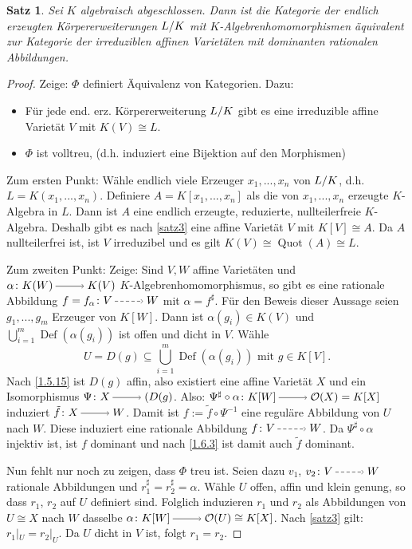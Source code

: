 \documentclass[a4paper,12pt]{scrbook}
\theoremstyle{keinenummern} %
\theoremstyle{mitnummern}
\newtheorem{satz}{Satz}
\theoremstyle{unserbeweis}
\newtheorem{proof}{Beweis}
\def\O{\mathcal{O}}
\newcommand{\Def}{\operatorname{Def}}
\newcommand{\Quot}{\operatorname{Quot}}
\newcommand{\restrict}[1]{|_{#1}}
\renewcommand{\dotsc}{\ensuremath{\!...}}
\newcommand{\ra}{\raisebox{-1pt}{\tikz{\draw[thin,shorten >=3pt, ->] (0,0) node{\hspace*{-2pt}} -- node{} (1,0);}}\penalty1000\relax}
\newcommand{\ppf}{\raisebox{-1pt}{\tikz{\draw[densely dashed,thin,shorten >=3pt, ->] (0,0) node{\hspace*{-2pt}} -- node{} (1,0);}}\penalty1000\relax}
\newcommand{\Quotient}[2]{
  \mathchoice
  { %
    \raisebox{0.7ex}{\ensuremath{#1}}
    \ensuremath{\mkern-3mu}\big/\ensuremath{\mkern-3mu}
    \raisebox{-0.6ex}{\ensuremath{#2}}
  }
  { %
    #1/#2
  }
  { %
    #1/#2
  }
  { %
    #1/#2
  }
}
\begin{document}
\begin{satz}\label{satz4} Sei $K$ algebraisch abgeschlossen. Dann ist die Kategorie der endlich erzeugten Körpererweiterungen $\Quotient{L}{K}$ mit $K$-Algebrenhomomorphismen äquivalent zur Kategorie der irreduziblen affinen Varietäten mit dominanten rationalen Abbildungen.
\end{satz}

\begin{proof} Zeige: $\Phi$ definiert Äquivalenz von Kategorien. Dazu:
  \begin{itemize}
  \item Für jede end. erz. Körpererweiterung $\Quotient{L}{K}$ gibt es eine irreduzible affine Varietät $V$ mit $K(V)\cong L$.
  \item $\Phi$ ist volltreu, (d.h. induziert eine Bijektion auf den Morphismen)
  \end{itemize}
Zum ersten Punkt: Wähle endlich viele Erzeuger $x_1,\dotsc,x_n$ von $\Quotient{L}{K}$, d.h. $L=K(x_1,\dotsc,x_n)$. Definiere $A=K[x_1,\dotsc,x_n]$ als die von $x_1,\dotsc,x_n$ erzeugte $K$-Algebra in $L$. Dann ist $A$ eine endlich erzeugte, reduzierte, nullteilerfreie
$K$-Algebra. Deshalb gibt es nach \cref{satz3} eine affine Varietät $V$ mit $K[V]\cong A$. Da $A$ nullteilerfrei ist, ist $V$ irreduzibel und es gilt $K(V)\cong \Quot(A)\cong L$.

Zum zweiten Punkt: Zeige: Sind $V,W$ affine Varietäten und $\alpha \colon K(W)\ra K(V)$ $K$-Algebrenhomomorphismus, so gibt es eine rationale Abbildung $f=f_{\alpha}\colon V\ppf W$ mit $\alpha=f^{\sharp}$.
Für den Beweis dieser Aussage seien $g_1,\dotsc,g_m$ Erzeuger von $K[W]$. Dann ist $\alpha(g_i)\in K(V)$ und $\bigcup_{i=1}^{m} \Def(\alpha(g_i))$ ist offen und dicht in $V$. Wähle \[U=D(g)\subseteq \bigcup_{i=1}^{m} \Def(\alpha(g_i))\text{ mit }g \in K[V].\]
Nach \cref{1.5.15} ist  $D(g)$ affin, also existiert eine affine Varietät $X$ und ein Isomorphismus $\Psi \colon X\ra (D(g)$.
Also: $\Psi^{\sharp}\circ \alpha \colon K[W] \ra \O(X)=K[X]$ induziert $\tilde{f} \colon X\ra W$.
Damit ist $f:=\tilde{f}\circ \Psi^{-1}$ eine reguläre Abbildung von $U$ nach $W$. Diese induziert eine rationale Abbildung $f \colon V\ppf W$. Da $\Psi^{\sharp}\circ \alpha$ injektiv ist, ist $f$ dominant und nach \cref{1.6.3} ist damit auch $\tilde{f}$ dominant.

Nun fehlt nur noch zu zeigen, dass $\Phi$ treu ist. Seien dazu $v_1$, $v_2 \colon V\ppf W$ rationale Abbildungen und $r_1^{\sharp}=r_2^{\sharp}=\alpha$. Wähle $U$ offen, affin und klein genung, so dass $r_1$, $r_2$ auf $U$ definiert sind.
Folglich induzieren $r_1$ und $r_2$ als Abbildungen von $U\cong X$ nach $W$ dasselbe $\alpha \colon K[W] \ra \O(U)\cong K[X]$. Nach \cref{satz3} gilt: $r_1\restrict{U}=r_2\restrict{U}$. Da $U$ dicht in $V$ ist, folgt $r_1=r_2$.
\end{proof}
\end{document}
